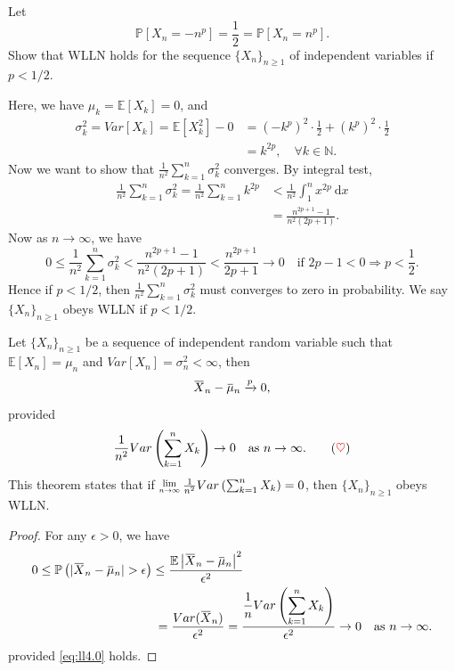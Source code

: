 \begin{example}
    Let
    \[
        \mathbb{P}[X_n = -n^p] = \frac{1}{2} = \mathbb{P}[X_n = n^p].
    \]
    Show that WLLN holds for the sequence $\{X_n\}_{n \geq 1}$ of independent variables 
    if $p < 1/2$.
\end{example}
\begin{solution}
    Here, we have $\mu_k = \mathbb{E}[X_k] = 0$, and 
    \begin{align*}
        \sigma^2_k = Var[X_k] = \mathbb{E}[X_k^2] - 0 &= \left(-k^p \right)^2 \cdot \frac{1}{2} + \left( k^p \right)^2 \cdot \frac{1}{2}\\
        &= k^{2p}, \quad \forall k \in \mathbb{N}.
    \end{align*}
    Now we want to show that $\frac{1}{n^2} \sum^n_{k=1} \sigma^2_k$ converges. By integral test,
    \begin{align*}
        \frac{1}{n^2} \sum^n_{k=1} \sigma^2_k = \frac{1}{n^2} \sum^n_{k=1} k^{2p} 
        &< \frac{1}{n^2} \int^n_{1} x^{2p} \> \mathrm{d}x\\
        &= \frac{n^{2p+1} - 1}{n^2(2p+1)}.
    \end{align*}
    Now as $n \to \infty$, we have
    \[
        0 \leq \frac{1}{n^2} \sum^n_{k=1} \sigma^2_k < \frac{n^{2p+1} - 1}{n^2 (2p + 1)} < \frac{n^{2p + 1}}{2p+1} \to 0
        \quad 
        \text{if } 2p-1 < 0 \Rightarrow p < \frac{1}{2}.
    \]
    Hence if $p < 1/2$, then $\frac{1}{n^2} \sum^n_{k=1} \sigma^2_k$ must converges to zero in probability. We say 
    $\{X_n\}_{n \geq 1}$ obeys WLLN if $p < 1/2$.
\end{solution}

\begin{theorem}
    Let $\{X_n \}_{n \geq 1}$ be a sequence of independent random variable such that 
    $\mathbb{E}[X_n] = \mu_n$ and $Var[X_n] = \sigma^2_n < \infty$, then
    \begin{equation}
        \ols{X}_n - \ols{\mu}_n \xrightarrow[]{p} 0,
    \end{equation}
    provided
    \[
        \frac{1}{n^2} Var\left(\sum^n_{k=1} X_k \right) \to 0 \quad \text{as } n \to \infty. \label{eq:ll4.0} \tag{{\color{red} $\heartsuit$}}
    \]
    This theorem states that if $\Lim{n \to \infty} \frac{1}{n^2} Var\left(\sum^n_{k=1} X_k \right) = 0$, then $\{X_n \}_{n \geq 1}$ obeys WLLN.
\end{theorem}
\begin{proof}
    For any $\epsilon > 0$, we have 
    \begin{align*}
        0 \leq \mathbb{P} \left( |\ols{X}_n - \ols{\mu}_n| > \epsilon \right) &\leq 
        \frac{\mathbb{E} \left| \ols{X}_n - \ols{\mu}_n \right|^2}{\epsilon^2}\\
        &\> = \frac{Var(\ols{X}_n)}{\epsilon^2} 
        = \frac{\displaystyle \frac{1}{n} Var\left(\sum^n_{k=1} X_k \right)}{\epsilon^2} \to 0 \quad \text{as } n \to \infty.
    \end{align*}
    provided \eqref{eq:ll4.0} holds.
\end{proof}

